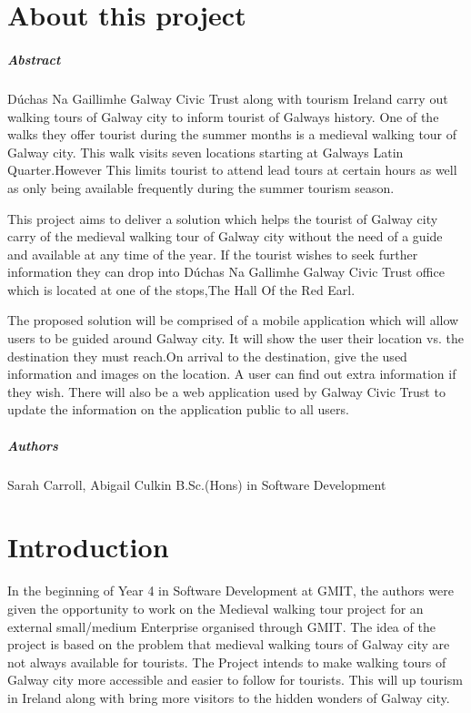 
\chapter*{About this project}
\paragraph{Abstract}

Dúchas Na Gaillimhe Galway Civic Trust along with tourism Ireland carry out walking tours of Galway city to inform tourist of Galways history. One of the walks they offer tourist during the summer months is a medieval walking tour of Galway city. This walk visits seven locations starting at Galways Latin Quarter.However This limits tourist to attend lead tours at certain hours as well as only being available frequently during the summer tourism season.

This project aims to deliver a solution which helps the tourist of Galway city carry of the medieval walking tour of Galway city without the 
need of a guide and available at any time of the year. If the tourist wishes to seek further information they can drop into Dúchas Na Gallimhe Galway Civic Trust office which is located at one of the stops,The Hall Of the Red Earl.

The proposed solution will be comprised of a mobile application which will allow users to be guided around Galway city. It will show the user their location vs. the destination they must reach.On arrival to the destination, give the used information and images on the location. A user can find out extra information if they wish. There will also be a web application used by Galway Civic Trust to update the information on the application public to all users.

\paragraph{Authors}
Sarah Carroll, Abigail Culkin
B.Sc.(Hons) in Software Development

\chapter{Introduction}

In the beginning of Year 4 in Software Development at GMIT, the authors were given the opportunity to work on the Medieval walking tour project for an external small/medium Enterprise organised through GMIT. The idea of the project is based on the problem that medieval walking tours of Galway city are not always available for tourists. The Project intends to make walking tours of Galway city more accessible and easier to follow for tourists. This will up tourism in Ireland along with bring more visitors to the hidden wonders of Galway city. 


